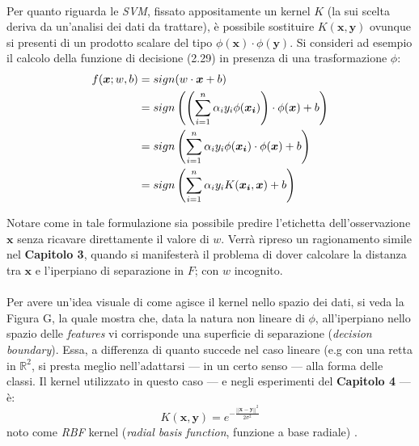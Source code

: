 \paragraph{}
Per quanto riguarda le \textit{SVM}, fissato appositamente un kernel $K$ (la sui scelta deriva da un'analisi dei dati da trattare), è possibile sostituire $K(\boldsymbol{x}, \boldsymbol{y})$ ovunque si presenti di un prodotto scalare del tipo $\phi(\boldsymbol{x}) \cdot \phi(\boldsymbol{y})$. Si consideri ad esempio il calcolo della funzione di decisione (2.29) in presenza di una trasformazione $\phi$:
\begin{equation}
\begin{split}
	f(\boldsymbol{x}; w, b) &= sign(w \cdot \boldsymbol{x} + b)
	\\ & = sign\left( \left( \sum\limits_{i = 1}^{n}{\alpha_i y_i \phi(\boldsymbol{x_i})} \right) \cdot \phi(\boldsymbol{x}) + b\right)
	\\ & = sign\left( \sum\limits_{i = 1}^{n}{\alpha_i y_i \phi(\boldsymbol{x_i}) \cdot \phi(\boldsymbol{x}) } + b\right)
	\\ & = sign\left( \sum\limits_{i = 1}^{n}{\alpha_i y_i K(\boldsymbol{x_i}, \boldsymbol{x}) } + b\right)
\end{split}
\vspace{2mm}
\end{equation}

Notare come in tale formulazione sia possibile predire l'etichetta dell'osservazione $\boldsymbol{x}$ senza ricavare direttamente il valore di $w$. Verrà ripreso un ragionamento simile nel \textbf{Capitolo 3}, quando si manifesterà il problema di dover calcolare la distanza tra $\boldsymbol{x}$ e l'iperpiano di separazione in $F$; con $w$ incognito.

\paragraph{}
Per avere un'idea visuale di come agisce il kernel nello spazio dei dati, si veda la Figura G, la quale mostra che, data la natura non lineare di $\phi$, all'iperpiano nello spazio delle \textit{features} vi corrisponde una superficie di separazione (\textit{decision boundary}). Essa, a differenza di quanto succede nel caso lineare (e.g con una retta in $\mathbb{R}^2$, si presta meglio nell'adattarsi --- in un certo senso --- alla forma delle classi.
Il kernel utilizzato in questo caso --- e negli esperimenti del \textbf{Capitolo 4} --- è:
\begin{equation}
	K(\boldsymbol{x}, \boldsymbol{y}) = e^{-\frac{||\boldsymbol{x} - \boldsymbol{y}||^2}{2\sigma^2}}
\end{equation}
noto come \textit{RBF} kernel (\textit{radial basis function}, funzione a base radiale) \cite{tutorial}.

